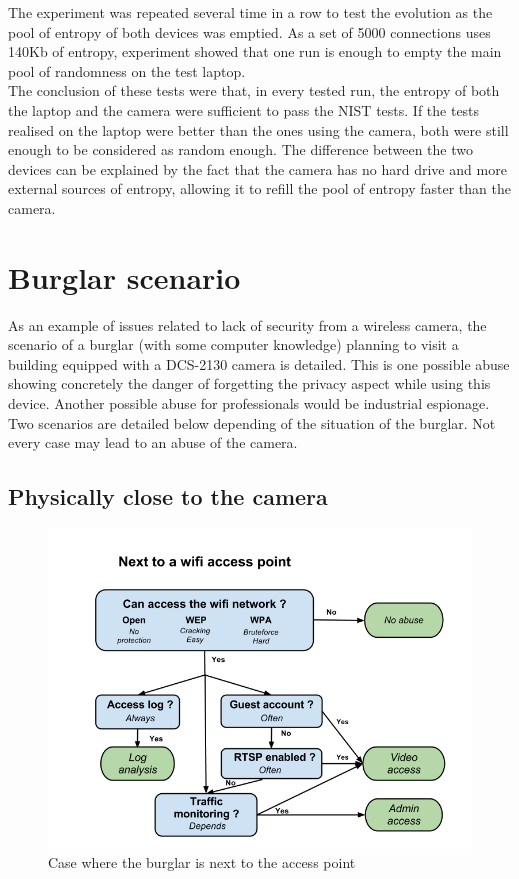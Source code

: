 The experiment was repeated several time in a row to test the evolution as the pool of entropy of both devices was emptied.
As a set of 5000 connections uses 140Kb of entropy, experiment showed that one run is enough to empty the main pool of randomness on the test laptop.\\

The conclusion of these tests were that, in every tested run, the entropy of both the laptop and the camera were sufficient to pass the NIST tests.
If the tests realised on the laptop were better than the ones using the camera, both were still enough to be considered as random enough.
The difference between the two devices can be explained by the fact that the camera has no hard drive and more external sources of entropy, allowing it to refill the pool of entropy faster than the camera.

\section{Burglar scenario}
\label{sec:dcs-burglar}

As an example of issues related to lack of security from a wireless camera, the scenario of a burglar (with some computer knowledge) planning to visit a building equipped with a DCS-2130 camera is detailed.
This is one possible abuse showing concretely the danger of forgetting the privacy aspect while using this device.
Another possible abuse for professionals would be industrial espionage.
Two scenarios are detailed below depending of the situation of the burglar.
Not every case may lead to an abuse of the camera.

\subsection{Physically close to the camera}

\begin{figure}[h]
  \centering
  \includegraphics[width=13cm]{images/burglar-inside.png}
  \caption{Case where the burglar is next to the access point}
  \label{fig:burglar-inside}
\end{figure}

